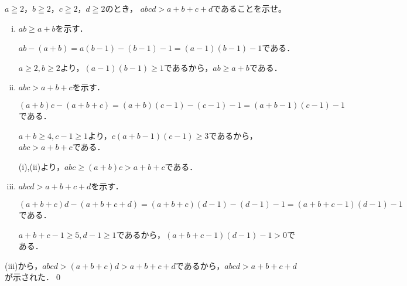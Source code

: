 
\begin{problem}
  $a\geqq2$，$b\geqq2$，$c\geqq2$，$d\geqq2$のとき，
  $abcd>a+b+c+d$であることを示せ。
\end{problem}
\begin{enumerate}[(i)]
  \item $ ab \geq a+b $を示す．

  $ab-(a+b) = a(b-1)-(b-1)-1=(a-1)(b-1)-1$である．

  $a\geq 2,b\geq 2$より，$(a-1)(b-1) \geq 1$であるから，$ab \geq a+b$である．

  \item $abc > a+b+c$を示す．

  $(a+b)c - (a+b+c) = (a+b)(c-1)-(c-1)-1 = (a+b-1)(c-1) -1$である．

  $a+b \geq 4, c-1 \geq 1$より，$c(a+b-1)(c-1)\geq 3$であるから，$abc > a+b+c$である．

  (i),(ii)より，$abc \geq (a+b)c > a+b+c$である．

  \item $abcd > a+b+c+d$を示す．

  $(a+b+c)d - (a+b+c+d) = (a+b+c)(d-1) - (d-1) - 1 = (a+b+c-1)(d-1)-1$である．

  $a+b+c-1 \geq 5, d-1\geq1$であるから，$(a+b+c-1)(d-1)-1 > 0$である．
\end{enumerate}
(iii)から，$abcd > (a+b+c)d > a+b+c+d$であるから，$abcd > a+b+c+d$が示された．\qed
